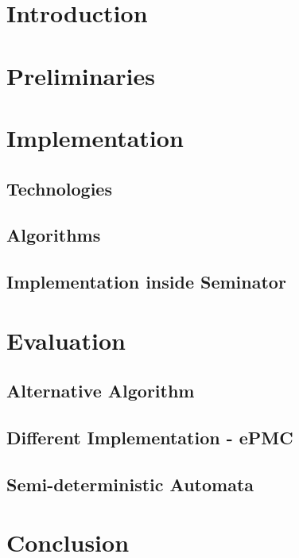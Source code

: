 \documentclass{fithesis3}
\begin{document}
	\chapter{Introduction}
	\chapter{Preliminaries}
	\chapter{Implementation}
		\section{Technologies}
		\section{Algorithms}
		\section{Implementation inside Seminator}
	\chapter{Evaluation}
		\section{Alternative Algorithm}
		\section{Different Implementation - ePMC}
		\section{Semi-deterministic Automata}
	\chapter{Conclusion}
\end{document}
